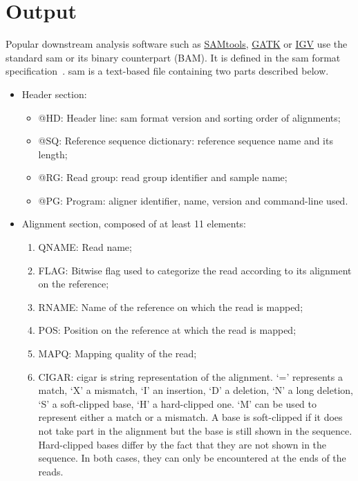 \section{Output}\label{sec:samoutput}
Popular downstream analysis software such as \href{http://www.htslib.org/}{SAMtools}, \href{https://www.broadinstitute.org/gatk/}{GATK} or \href{https://www.broadinstitute.org/igv/}{IGV} use the standard \gls{sam} or its binary counterpart (BAM).
It is defined in the \gls{sam} format specification~\cite{samspec}.
\gls{sam} is a text-based file containing two parts described below.
\begin{itemize}
    \item Header section:
    \begin{itemize}
        \item @HD\@: Header line: \gls{sam} format version and sorting order of alignments;
        \item @SQ\@: Reference sequence dictionary: reference sequence name and its length;
        \item @RG\@: Read group: read group identifier and sample name;
        \item @PG\@: Program: aligner identifier, name, version and command-line used.
    \end{itemize}
    \item Alignment section, composed of at least 11 elements:
    \begin{enumerate}
        \item QNAME\@: Read name;
        \item FLAG\@: Bitwise flag used to categorize the read according to its alignment on the reference;
        \item RNAME\@: Name of the reference on which the read is mapped;
        \item POS\@: Position on the reference at which the read is mapped;
        \item MAPQ\@: Mapping quality of the read;
        \item CIGAR\@: \gls{cigar} is string representation of the alignment.
        `=' represents a match, `X' a mismatch, `I' an insertion, `D' a deletion, `N' a long deletion, `S' a soft-clipped base, `H' a hard-clipped one.
        `M' can be used to represent either a match or a mismatch.
        A base is soft-clipped if it does not take part in the alignment but the base is still shown in the sequence.
        Hard-clipped bases differ by the fact that they are not shown in the sequence.
        In both cases, they can only be encountered at the ends of the reads.

\end{enumerate}
\end{itemize}
